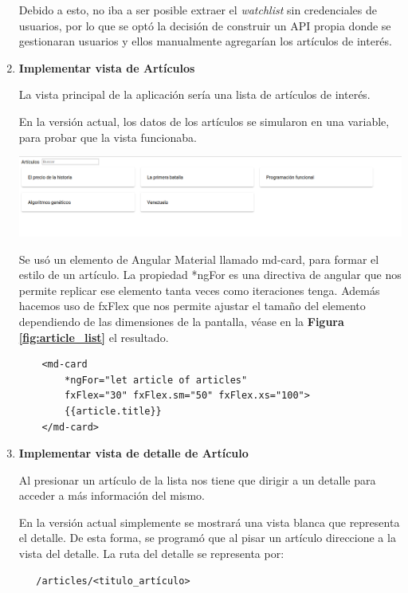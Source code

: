 \begin{enumerate}
  Debido a esto, no iba a ser posible extraer el \textit{watchlist} sin credenciales de usuarios, por lo que se optó la decisión de construir un API propia donde se gestionaran usuarios y ellos manualmente agregarían los artículos de interés.
  
  \smallbreak
  \item\textbf{Implementar vista de Artículos}
  \smallbreak
  
  La vista principal de la aplicación sería una lista de artículos de interés.
  
  En la versión actual, los datos de los artículos se simularon en una variable, para probar que la vista funcionaba.
  \begin{center}
      \bigbreak
      \includegraphics[scale=0.2]{images/marco_aplicativo/lista_articulos.png}
      \label{fig:article_list}
      \bigbreak
  \end{center}
  
  Se usó un elemento de Angular Material llamado md-card, para formar el estilo de un artículo. La propiedad *ngFor es una directiva de angular que nos permite replicar ese elemento tanta veces como iteraciones tenga. Además hacemos uso de fxFlex que nos permite ajustar el tamaño del elemento dependiendo de las dimensiones de la pantalla, véase en la \textbf{Figura \ref{fig:article_list}} el resultado.
  \begin{verbatim}
    <md-card 
        *ngFor="let article of articles"
        fxFlex="30" fxFlex.sm="50" fxFlex.xs="100">
        {{article.title}}
    </md-card>
  \end{verbatim}
  
  \smallbreak
  \item\textbf{Implementar vista de detalle de  Artículo}
  \smallbreak
  
  Al presionar un artículo de la lista nos tiene que  dirigir a un detalle para acceder a más información del mismo.
  
  En la versión actual simplemente se mostrará una vista blanca que representa el detalle. De esta forma, se programó que al pisar un artículo direccione a la vista del detalle. La ruta del detalle se representa por: 
  \begin{verbatim}
   /articles/<titulo_artículo>
  \end{verbatim}
  

\end{enumerate}
